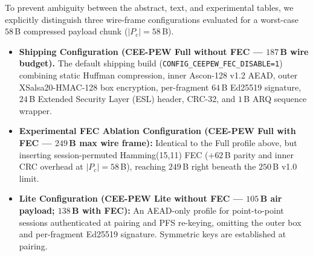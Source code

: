 \documentclass[conference]{IEEEtran}
\begin{document}
To prevent ambiguity between the abstract, text, and experimental tables, we explicitly distinguish three wire-frame configurations evaluated for a worst-case $58$\,B compressed payload chunk ($|P_c|=58$\,B).
\begin{itemize}
\setlength{\itemsep}{0pt}\setlength{\parskip}{0pt}
\item \textbf{Shipping Configuration (CEE-PEW Full without FEC --- $187$\,B wire budget).} The default shipping build (\texttt{CONFIG\_CEEPEW\_FEC\_DISABLE=1}) combining static Huffman compression, inner Ascon-128 v1.2 AEAD, outer XSalsa20-HMAC-128 box encryption, per-fragment $64$\,B Ed25519 signature, $24$\,B Extended Security Layer (ESL) header, CRC-32, and $1$\,B ARQ sequence wrapper.
\item \textbf{Experimental FEC Ablation Configuration (CEE-PEW Full with FEC --- $249$\,B max wire frame):} Identical to the Full profile above, but inserting session-permuted Hamming(15,11) FEC ($+62$\,B parity and inner CRC overhead at $|P_c|=58$\,B), reaching $249$\,B right beneath the $250$\,B v1.0 limit.
\item \textbf{Lite Configuration (CEE-PEW Lite without FEC --- $105$\,B air payload; $138$\,B with FEC):} An AEAD-only profile for point-to-point sessions authenticated at pairing and PFS re-keying, omitting the outer box and per-fragment Ed25519 signature. Symmetric keys are established at pairing.
\end{itemize}
\end{document}
